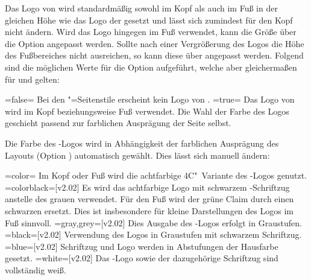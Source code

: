 \begin{DeclareEntity*}{}
\begin{DeclareEntity*}{}
\begin{DeclareEntity*}{}
\begin{Declaration}
\begin{Declaration}
\begin{Declaration}
Das Logo von \DDC wird standardmäßig sowohl im Kopf als auch im Fuß in der 
gleichen Höhe wie das Logo der \TnUD gesetzt und lässt sich zumindest für den 
Kopf nicht ändern. Wird das Logo hingegen im Fuß verwendet, kann die Größe über 
die Option  angepasst werden. Sollte nach einer 
Vergrößerung des Logos die Höhe des Fußbereiches nicht ausreichen, so kann 
diese über  angepasst werden. Folgend sind 
die möglichen Werte für die Option  aufgeführt, welche aber 
gleichermaßen für  und  gelten:
\begin{DeclareValues}
\itemval=false=
  Bei den "=Seitenstile erscheint kein Logo von \DDC.
\itemval*=true=
  Das Logo von \DDC wird im Kopf beziehungsweise Fuß verwendet. Die Wahl der 
  Farbe des Logos geschieht passend zur farblichen Ausprägung der Seite selbst.
\end{DeclareValues}

Die Farbe des \DDC-Logos wird in Abhängigkeit der farblichen Ausprägung des 
Layouts (Option ) automatisch gewählt. Dies lässt sich 
manuell ändern:
\begin{DeclareValues}
\itemval=color=
  Im Kopf oder Fuß wird die achtfarbige 4C"~Variante des \DDC-Logos genutzt.
\itemval=colorblack=[v2.02]
  Es wird das achtfarbige Logo mit schwarzem \DDC-Schriftzug anstelle des 
  grauen verwendet. Für den Fuß wird der grüne Claim durch einen schwarzen 
  ersetzt. Dies ist insbesondere für kleine Darstellungen des Logos im Fuß 
  sinnvoll.
\itemval=gray,grey=[v2.02]
  Dies Ausgabe des \DDC-Logos erfolgt in Graustufen.
\itemval=black=[v2.02]
  Verwendung des Logos in Graustufen mit schwarzem Schriftzug.
\itemval=blue=[v2.02]
  Schriftzug und Logo werden in Abstufungen der Hausfarbe  gesetzt.
\itemval=white=[v2.02]
  Das \DDC-Logo sowie der dazugehörige Schriftzug sind vollständig weiß.
\end{DeclareValues}
%
\end{Declaration}
\end{Declaration}
\end{Declaration}


\end{DeclareEntity*}
\end{DeclareEntity*}
\end{DeclareEntity*}
